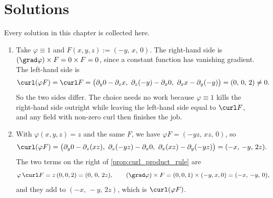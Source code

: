 
\section{Solutions}
\label{sec:vector_calculus_solutions}

Every solution in this chapter is collected here.

\begin{exercisesolution}
\label{sol:ai_curl_product_rule_counterexample}
\begin{enumerate}[label=\textbf{(\alph*)}]
  \item Take $\varphi \equiv 1$ and $F(x,y,z) := (-y,\,x,\,0)$. The right-hand side is
    $(\grad\varphi)\times F = 0\times F = 0$, since a constant function has vanishing gradient.
    The left-hand side is
    \[\curl(\varphi F) = \curl F
      = \big(\partial_y0 - \partial_z x,\ \partial_z(-y) - \partial_x 0,\
        \partial_x x - \partial_y(-y)\big) = (0,\,0,\,2) \neq 0.\]
    So the two sides differ. The choice needs no work because $\varphi \equiv 1$ kills the
    right-hand side outright while leaving the left-hand side equal to $\curl F$, and any field
    with non-zero curl then finishes the job.
  \item With $\varphi(x,y,z) = z$ and the same $F$, we have $\varphi F = (-yz,\,xz,\,0)$, so
    \[\curl(\varphi F)
      = \big(\partial_y0 - \partial_z(xz),\ \partial_z(-yz) - \partial_x0,\
        \partial_x(xz) - \partial_y(-yz)\big) = (-x,\,-y,\,2z).\]
    The two terms on the right of \cref{prop:curl_product_rule} are
    \[\varphi\,\curl F = z\,(0,0,2) = (0,\,0,\,2z),
      \qquad
      (\grad\varphi)\times F = (0,0,1)\times(-y,x,0) = (-x,\,-y,\,0),\]
    and they add to $(-x,\,-y,\,2z)$, which is $\curl(\varphi F)$.
\end{enumerate}
\end{exercisesolution}

